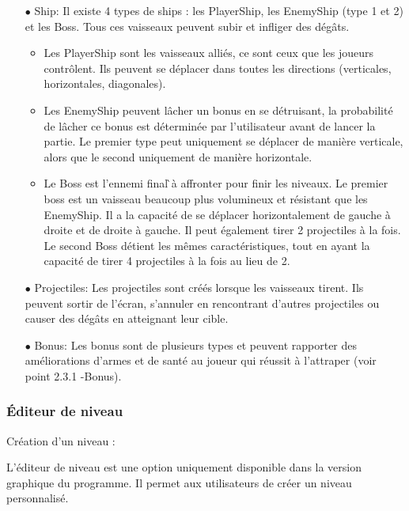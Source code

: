 \documentclass[a4paper,12pt]{article}
\begin{document}
\begin{itemize}
    \item[$\bullet$ Ship:] Il existe 4 types de ships : les PlayerShip, les EnemyShip (type 1 et 2) et les Boss. Tous ces vaisseaux peuvent subir et infliger des dégâts. 
    \begin{itemize}
        \item Les PlayerShip sont les vaisseaux alliés, ce sont ceux que les joueurs contrôlent. Ils peuvent se déplacer dans toutes les directions (verticales, horizontales, diagonales).
        \item Les EnemyShip peuvent lâcher un bonus en se détruisant, la probabilité de lâcher ce bonus est déterminée par l’utilisateur avant de lancer la partie. Le premier type peut uniquement se déplacer de manière verticale, alors que le second uniquement de manière horizontale.
        \item Le Boss est l’ennemi final ̀à affronter pour finir les niveaux. Le premier boss est un vaisseau beaucoup plus volumineux et résistant que les EnemyShip. Il a la capacité de se déplacer horizontalement de gauche à droite et de droite à gauche. Il peut également tirer 2 projectiles à la fois. Le second Boss détient les mêmes caractéristiques, tout en ayant la capacité de tirer 4 projectiles à la fois au lieu de 2.\\
    \end{itemize}

    \item[$\bullet$ Projectiles:]Les projectiles sont créés lorsque les vaisseaux tirent. Ils peuvent sortir de l’écran, s’annuler en rencontrant d’autres projectiles ou causer des dégâts en atteignant leur cible.\\

    \item[$\bullet$ Bonus:]Les bonus sont de plusieurs types et peuvent rapporter des améliorations d’armes et de santé au joueur qui réussit à l'attraper (voir point 2.3.1 -Bonus).
\end{itemize}

\subsubsection{Éditeur de niveau}

Création d'un niveau : 

L'éditeur de niveau est une option uniquement disponible dans la version graphique du programme. Il permet aux utilisateurs de créer un niveau personnalisé.
\end{document}
